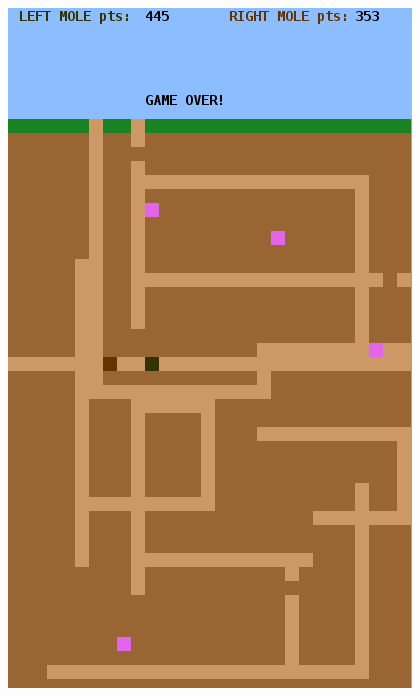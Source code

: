 {\raggedright%
\begin{minipage}{0.56\textwidth}
\begin{figure}[H]
  \centering
  \includegraphics[width=\textwidth]{../img/blockbattle.png}
  \label{lab:blockbattle:fig:game}
\end{figure}
\end{minipage}%
}%
\newlength{\currentparskip}%
\newlength{\currentparindent}%
